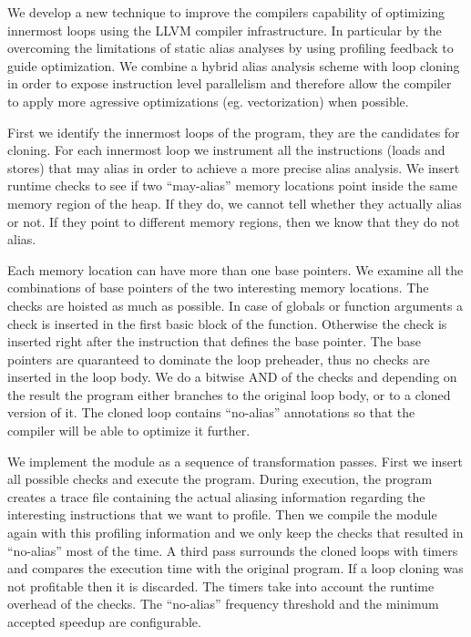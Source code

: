 \documentclass{article}
\begin{document}
We develop a new technique to improve the compilers capability of optimizing innermost loops using the LLVM compiler infrastructure.
In particular by the overcoming the limitations of static alias analyses by using profiling feedback to guide optimization.
We combine a hybrid alias analysis scheme with loop cloning in order to expose instruction level parallelism and therefore allow the compiler to apply more agressive optimizations (eg. vectorization) when possible.

First we identify the innermost loops of the program, they are the candidates for cloning. For each
innermost loop we instrument all the instructions (loads and stores) that may alias in order to achieve a more precise alias analysis. We insert runtime checks to see if two ``may-alias'' memory locations point inside the same memory region of the heap. If they do, we cannot tell whether they actually alias or not. If they point to different memory regions, then we know that they do not alias.

Each memory location can have more than one base pointers. We examine all the combinations of base pointers of the two interesting memory locations. The checks are hoisted as much as possible. In case of globals or function arguments a check is inserted in the first basic block of the function. Otherwise the check is inserted right after the instruction that defines the base pointer. The base pointers are quaranteed to dominate the loop preheader, thus no checks are inserted in the loop body. We do a bitwise AND of the checks and depending on the result the program either branches to the original loop body, or to a cloned version of it. The cloned loop contains ``no-alias'' annotations so that the compiler will be able to optimize it further.

We implement the module as a sequence of transformation passes. First we insert all possible checks and execute the program. During execution, the program creates a trace file containing the actual aliasing information regarding the interesting instructions that we want to profile. Then we compile the module again with this profiling information and we only keep the checks that resulted in ``no-alias'' most of the
time. A third pass surrounds the cloned loops with timers and compares the execution time with the original program. If a loop cloning was not profitable then it is discarded. The timers take into account the runtime overhead of the checks. The ``no-alias'' frequency threshold and the minimum accepted speedup are configurable.
\end{document}
